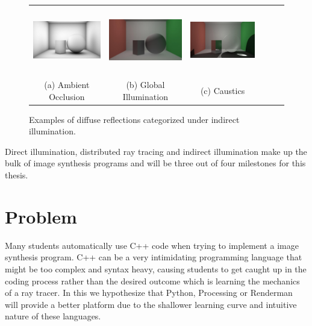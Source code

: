 \documentclass{article}
\begin{document}
\begin{figure}[htbp]
\begin{center}
\begin{tabular}{cccccc}
\includegraphics[height=1.15in]{images/aOcclusion}&
\includegraphics[height=1.15in]{images/globalIll}&
\includegraphics[height=1.15in]{images/caustics}\\
(a) Ambient Occlusion & (b) Global Illumination & (c) Caustics \\
\end{tabular}
\caption{Examples of diffuse reflections categorized under indirect illumination.}
\label{fig:regions}
\end{center}
\end{figure}

Direct illumination, distributed ray tracing and indirect illumination make up the bulk of image synthesis programs and will be three out of four milestones for this thesis.
\section{Problem}
Many students automatically use C++ code when trying to implement a image synthesis program.  C++ can be a very intimidating programming language that might be too complex and syntax heavy, causing students to get caught up in the coding process rather than the desired outcome which is learning the mechanics of a ray tracer.  In this we hypothesize that Python, Processing or Renderman will provide a better platform due to the shallower learning curve and intuitive nature of these languages.
\end{document}
